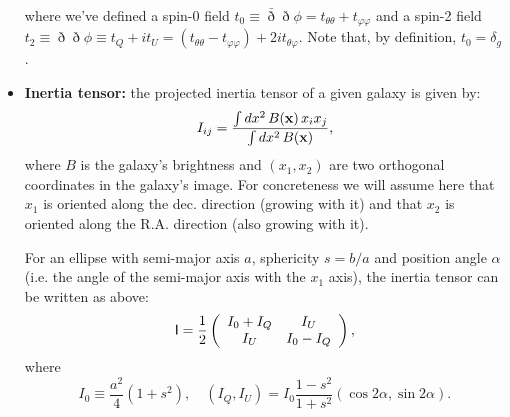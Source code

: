 \documentclass{article}
\begin{document}
\begin{itemize}
    where we've defined a spin-0 field $t_0\equiv\bar{\eth}\eth\phi=t_{\theta\theta}+t_{\varphi\varphi}$ and a spin-2 field $t_2\equiv\eth\eth\phi\equiv t_Q+it_U=(t_{\theta\theta}-t_{\varphi\varphi})+2it_{\theta\varphi}$. Note that, by definition, $t_0=\delta_g$.
    \item {\bf Inertia tensor:} the projected inertia tensor of a given galaxy is given by:
    \begin{equation}
      I_{ij}=\frac{\int dx^2\,B({\bf x})\,x_ix_j}{\int dx^2\,B({\bf x})},
    \end{equation}
    where $B$ is the galaxy's brightness and $(x_1,x_2)$ are two orthogonal coordinates in the galaxy's image. For concreteness we will assume here that $x_1$ is oriented along the dec. direction (growing with it) and that $x_2$ is oriented along the R.A. direction (also growing with it).
    
    For an ellipse with semi-major axis $a$, sphericity $s=b/a$ and position angle $\alpha$ (i.e. the angle of the semi-major axis with the $x_1$ axis), the inertia tensor can be written as above:
    \begin{equation}
      {\sf I}=\frac{1}{2}\left(
      \begin{array}{cc}
        I_0+I_Q & I_U \\
        I_U & I_0-I_Q
      \end{array}
      \right),
    \end{equation}
    where
    \begin{equation}
      I_0\equiv\frac{a^2}{4}(1+s^2),\hspace{12pt}(I_Q,I_U)=I_0\frac{1-s^2}{1+s^2}\left(\cos2\alpha,\sin2\alpha\right).
    \end{equation}
\end{itemize}
\end{document}
